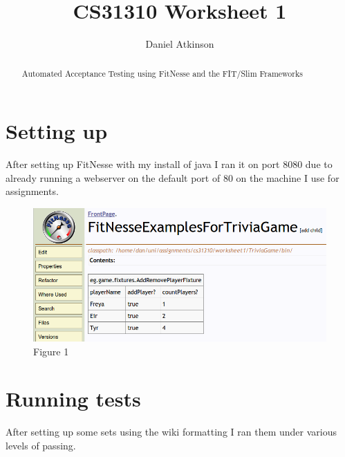 \documentclass{article}
\begin{document}
\title{CS31310 Worksheet 1}

\author{Daniel Atkinson}

\maketitle

\begin{abstract}

Automated Acceptance Testing using FitNesse and the FIT/Slim Frameworks

\end{abstract}


\section{Setting up}
After setting up FitNesse with my install of java I ran it on port 8080 due to already running a webserver on the default port of 80 on the machine I use for assignments.
\begin{figure}[h]
\centering
	\includegraphics[width=5.0in] {figures/Screenshot1.png}
	\caption{Figure 1}
	\label{Adding players}
\end{figure}


\section{Running tests}
After setting up some sets using the wiki formatting I ran them under various levels of passing.
\end{document}
